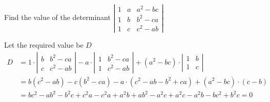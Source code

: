 

\question[1] Find the value of the determinant 
$\left|
  \begin{array}{ccc}
    1 & a & a^2-bc \\
    1 & b & b^2-ca \\
    1 & c & c^2-ab
  \end{array}
\right|
$


\ifprintanswers
\fi 

\begin{solution}[\halfpage]
    Let the required value be $D$
	\begin{align}
	  D &= 1\cdot\left|
	    \begin{array}{cc}
	      b & b^2-ca \\
	      c & c^2-ab
	    \end{array}
	  \right| - a\cdot \left|
	    \begin{array}{cc}
	      1 & b^2-ca \\
	      1 & c^2-ab
	    \end{array}
	  \right| + (a^2-bc)\cdot\left|
	    \begin{array}{cc}
	      1 & b \\
	      1 & c
	    \end{array}
	  \right| \\
	  &= b(c^2-ab) - c(b^2-ca) -a\cdot(c^2-ab-b^2+ca) + (a^2-bc)\cdot(c-b) \\
	  &= bc^2-ab^2-b^2c+c^2a-c^2a+a^2b+ab^2-a^2c+a^2c-a^2b-bc^2+b^2c = 0
	\end{align}
\end{solution}
